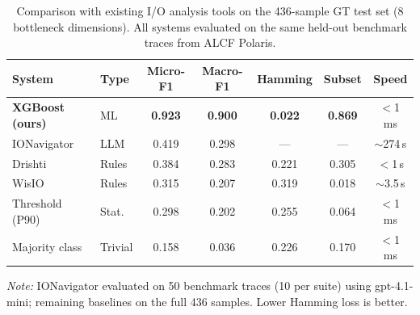 \begin{table}[t]
\centering
\caption{Comparison with existing I/O analysis tools on the 436-sample GT
test set (8 bottleneck dimensions). All systems evaluated on the same held-out
benchmark traces from ALCF Polaris.}
\label{tab:baselines}
\small
\begin{tabular}{llccccc}
\toprule
\textbf{System} & \textbf{Type} & \textbf{Micro-F1} & \textbf{Macro-F1} & \textbf{Hamming} & \textbf{Subset} & \textbf{Speed} \\
\midrule
\textbf{XGBoost (ours)}        & ML     & \textbf{0.923} & \textbf{0.900} & \textbf{0.022} & \textbf{0.869} & $<$1\,ms \\
IONavigator~\cite{egersdoerfer2025ioagent} & LLM    & 0.419          & 0.298          & ---            & ---            & $\sim$274\,s \\
Drishti~\cite{bez2022drishti}         & Rules  & 0.384          & 0.283          & 0.221          & 0.305          & $<$1\,s \\
WisIO~\cite{devarajan2025wisio}             & Rules  & 0.315          & 0.207          & 0.319          & 0.018          & $\sim$3.5\,s \\
Threshold (P90)                & Stat.  & 0.298          & 0.202          & 0.255          & 0.064          & $<$1\,ms \\
Majority class                 & Trivial& 0.158          & 0.036          & 0.226          & 0.170          & $<$1\,ms \\
\bottomrule
\end{tabular}
\vspace{1mm}
\raggedright
\footnotesize
\textit{Note:} IONavigator evaluated on 50 benchmark traces (10 per suite)
using gpt-4.1-mini; remaining baselines on the full 436 samples. Lower Hamming loss is better.
\end{table}
